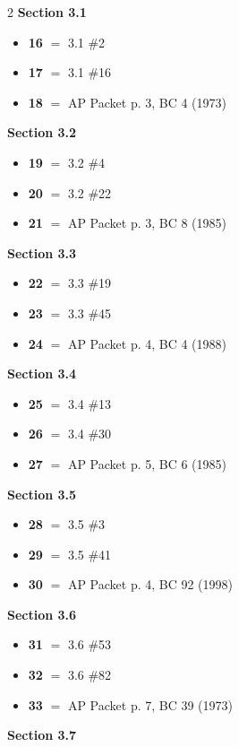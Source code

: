 \documentclass[11pt]{article}
\begin{document}
\begin{multicols}{2}
\smallskip
\noindent\textbf{Section 3.1}
\begin{itemize}[leftmargin=1.5em,itemsep=1pt,topsep=2pt]
\item[] \textbf{16} $=$ 3.1 \#2
\item[] \textbf{17} $=$ 3.1 \#16
\item[] \textbf{18} $=$ AP Packet p. 3, BC 4 (1973)
\end{itemize}
\smallskip
\noindent\textbf{Section 3.2}
\begin{itemize}[leftmargin=1.5em,itemsep=1pt,topsep=2pt]
\item[] \textbf{19} $=$ 3.2 \#4
\item[] \textbf{20} $=$ 3.2 \#22
\item[] \textbf{21} $=$ AP Packet p. 3, BC 8 (1985)
\end{itemize}
\smallskip
\noindent\textbf{Section 3.3}
\begin{itemize}[leftmargin=1.5em,itemsep=1pt,topsep=2pt]
\item[] \textbf{22} $=$ 3.3 \#19
\item[] \textbf{23} $=$ 3.3 \#45
\item[] \textbf{24} $=$ AP Packet p. 4, BC 4 (1988)
\end{itemize}
\smallskip
\noindent\textbf{Section 3.4}
\begin{itemize}[leftmargin=1.5em,itemsep=1pt,topsep=2pt]
\item[] \textbf{25} $=$ 3.4 \#13
\item[] \textbf{26} $=$ 3.4 \#30
\item[] \textbf{27} $=$ AP Packet p. 5, BC 6 (1985)
\end{itemize}
\smallskip
\noindent\textbf{Section 3.5}
\begin{itemize}[leftmargin=1.5em,itemsep=1pt,topsep=2pt]
\item[] \textbf{28} $=$ 3.5 \#3
\item[] \textbf{29} $=$ 3.5 \#41
\item[] \textbf{30} $=$ AP Packet p. 4, BC 92 (1998)
\end{itemize}
\smallskip
\noindent\textbf{Section 3.6}
\begin{itemize}[leftmargin=1.5em,itemsep=1pt,topsep=2pt]
\item[] \textbf{31} $=$ 3.6 \#53
\item[] \textbf{32} $=$ 3.6 \#82
\item[] \textbf{33} $=$ AP Packet p. 7, BC 39 (1973)
\end{itemize}
\smallskip
\noindent\textbf{Section 3.7}

\end{multicols}
\end{document}
